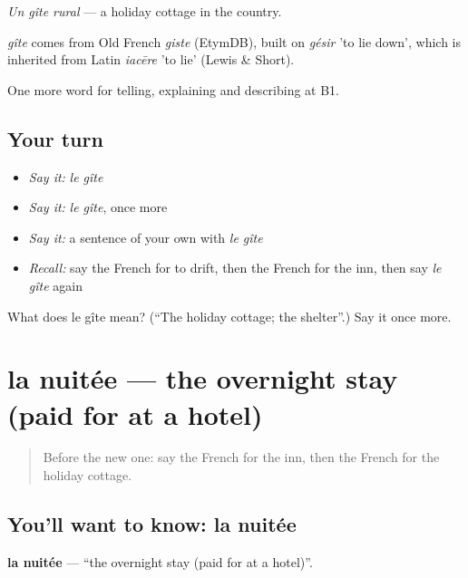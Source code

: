 \emph{Un gîte rural} — a holiday cottage in the country.

\begin{cousinweb}
\emph{gîte} comes from Old French \emph{giste} (EtymDB), built on \emph{gésir} 'to lie down', which is inherited from Latin \emph{iacēre} 'to lie' (Lewis \& Short).
\end{cousinweb}

\begin{grammarlens}[title={What you've built}]
One more word for telling, explaining and describing at B1.
\end{grammarlens}

\subsection*{Your turn}
\begin{itemize}
\raggedright
  \item \emph{Say it:} \emph{le gîte}
  \item \emph{Say it:} \emph{le gîte}, once more
  \item \emph{Say it:} a sentence of your own with \emph{le gîte}
  \item \emph{Recall:} say the French for to drift, then the French for the inn, then say \emph{le gîte} again
\end{itemize}

\begin{tcolorbox}[breakable,colback=teal!4,colframe=teal!35!black,title={Before you move on}]
What does le gîte mean? (\textquotedblleft{}The holiday cottage; the shelter\textquotedblright{}.) Say it once more.
\end{tcolorbox}
\section[la nuitée]{la nuitée — the overnight stay (paid for at a hotel)}

\label{lesson:FR-C424-nuitee}



\begin{quote}
Before the new one: say the French for the inn, then the French for the holiday cottage.
\end{quote}

\subsection*{You'll want to know: la nuitée}
\textbf{la nuitée} — \textquotedblleft{}the overnight stay (paid for at a hotel)\textquotedblright{}.

